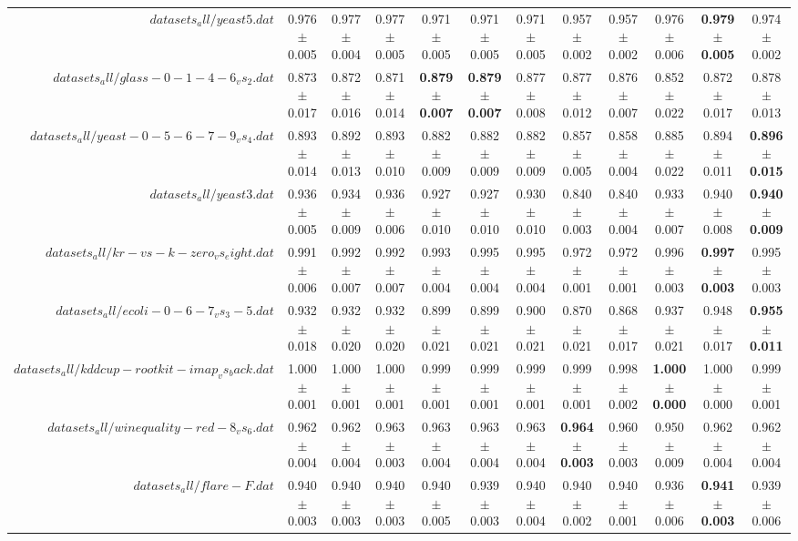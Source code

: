 \begin{table}[!ht]
{\begin{tabular}{r c c c c c c c c c c c}
$datasets_all/yeast5.dat$ & 0.976 $\pm$ 0.005 & 0.977 $\pm$ 0.004 & 0.977 $\pm$ 0.005 & 0.971 $\pm$ 0.005 & 0.971 $\pm$ 0.005 & 0.971 $\pm$ 0.005 & 0.957 $\pm$ 0.002 & 0.957 $\pm$ 0.002 & 0.976 $\pm$ 0.006 & \textbf{0.979 $\pm$ 0.005} & 0.974 $\pm$ 0.002 \\
$datasets_all/glass-0-1-4-6_vs_2.dat$ & 0.873 $\pm$ 0.017 & 0.872 $\pm$ 0.016 & 0.871 $\pm$ 0.014 & \textbf{0.879 $\pm$ 0.007} & \textbf{0.879 $\pm$ 0.007} & 0.877 $\pm$ 0.008 & 0.877 $\pm$ 0.012 & 0.876 $\pm$ 0.007 & 0.852 $\pm$ 0.022 & 0.872 $\pm$ 0.017 & 0.878 $\pm$ 0.013 \\
$datasets_all/yeast-0-5-6-7-9_vs_4.dat$ & 0.893 $\pm$ 0.014 & 0.892 $\pm$ 0.013 & 0.893 $\pm$ 0.010 & 0.882 $\pm$ 0.009 & 0.882 $\pm$ 0.009 & 0.882 $\pm$ 0.009 & 0.857 $\pm$ 0.005 & 0.858 $\pm$ 0.004 & 0.885 $\pm$ 0.022 & 0.894 $\pm$ 0.011 & \textbf{0.896 $\pm$ 0.015} \\
$datasets_all/yeast3.dat$ & 0.936 $\pm$ 0.005 & 0.934 $\pm$ 0.009 & 0.936 $\pm$ 0.006 & 0.927 $\pm$ 0.010 & 0.927 $\pm$ 0.010 & 0.930 $\pm$ 0.010 & 0.840 $\pm$ 0.003 & 0.840 $\pm$ 0.004 & 0.933 $\pm$ 0.007 & 0.940 $\pm$ 0.008 & \textbf{0.940 $\pm$ 0.009} \\
$datasets_all/kr-vs-k-zero_vs_eight.dat$ & 0.991 $\pm$ 0.006 & 0.992 $\pm$ 0.007 & 0.992 $\pm$ 0.007 & 0.993 $\pm$ 0.004 & 0.995 $\pm$ 0.004 & 0.995 $\pm$ 0.004 & 0.972 $\pm$ 0.001 & 0.972 $\pm$ 0.001 & 0.996 $\pm$ 0.003 & \textbf{0.997 $\pm$ 0.003} & 0.995 $\pm$ 0.003 \\
$datasets_all/ecoli-0-6-7_vs_3-5.dat$ & 0.932 $\pm$ 0.018 & 0.932 $\pm$ 0.020 & 0.932 $\pm$ 0.020 & 0.899 $\pm$ 0.021 & 0.899 $\pm$ 0.021 & 0.900 $\pm$ 0.021 & 0.870 $\pm$ 0.021 & 0.868 $\pm$ 0.017 & 0.937 $\pm$ 0.021 & 0.948 $\pm$ 0.017 & \textbf{0.955 $\pm$ 0.011} \\
$datasets_all/kddcup-rootkit-imap_vs_back.dat$ & 1.000 $\pm$ 0.001 & 1.000 $\pm$ 0.001 & 1.000 $\pm$ 0.001 & 0.999 $\pm$ 0.001 & 0.999 $\pm$ 0.001 & 0.999 $\pm$ 0.001 & 0.999 $\pm$ 0.001 & 0.998 $\pm$ 0.002 & \textbf{1.000 $\pm$ 0.000} & 1.000 $\pm$ 0.000 & 0.999 $\pm$ 0.001 \\
$datasets_all/winequality-red-8_vs_6.dat$ & 0.962 $\pm$ 0.004 & 0.962 $\pm$ 0.004 & 0.963 $\pm$ 0.003 & 0.963 $\pm$ 0.004 & 0.963 $\pm$ 0.004 & 0.963 $\pm$ 0.004 & \textbf{0.964 $\pm$ 0.003} & 0.960 $\pm$ 0.003 & 0.950 $\pm$ 0.009 & 0.962 $\pm$ 0.004 & 0.962 $\pm$ 0.004 \\
$datasets_all/flare-F.dat$ & 0.940 $\pm$ 0.003 & 0.940 $\pm$ 0.003 & 0.940 $\pm$ 0.003 & 0.940 $\pm$ 0.005 & 0.939 $\pm$ 0.003 & 0.940 $\pm$ 0.004 & 0.940 $\pm$ 0.002 & 0.940 $\pm$ 0.001 & 0.936 $\pm$ 0.006 & \textbf{0.941 $\pm$ 0.003} & 0.939 $\pm$ 0.006 \\

\end{tabular}}
\end{table}

